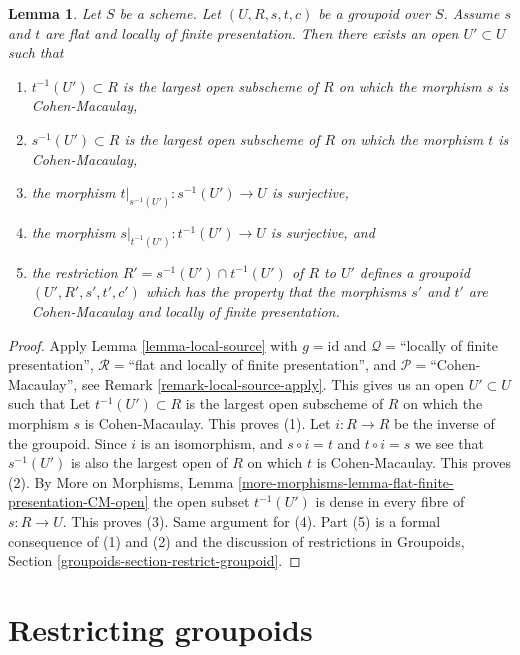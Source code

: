 \documentclass{stacks-project}
\theoremstyle{plain}
\newtheorem{lemma}[subsection]{Lemma}
\theoremstyle{definition}
\theoremstyle{remark}
\numberwithin{equation}{subsection}
\begin{document}
\begin{lemma}
\label{lemma-make-CM}
Let $S$ be a scheme.
Let $(U, R, s, t, c)$ be a groupoid over $S$.
Assume $s$ and $t$ are flat and locally of finite presentation.
Then there exists an open $U' \subset U$ such that
\begin{enumerate}
\item $t^{-1}(U') \subset R$ is the largest open subscheme of
$R$ on which the morphism $s$ is Cohen-Macaulay,
\item $s^{-1}(U') \subset R$ is the largest open subscheme of
$R$ on which the morphism $t$ is Cohen-Macaulay,
\item the morphism $t|_{s^{-1}(U')} : s^{-1}(U') \to U$ is
surjective,
\item the morphism $s|_{t^{-1}(U')} : t^{-1}(U') \to U$ is
surjective, and
\item the restriction $R' = s^{-1}(U') \cap t^{-1}(U')$
of $R$ to $U'$ defines a groupoid $(U', R', s', t', c')$ which has the property
that the morphisms $s'$ and $t'$ are Cohen-Macaulay and locally of
finite presentation.
\end{enumerate}
\end{lemma}

\begin{proof}
Apply
Lemma \ref{lemma-local-source}
with
$g = \text{id}$ and
$\mathcal{Q} =$``locally of finite presentation'',
$\mathcal{R} =$``flat and locally of finite presentation'', and
$\mathcal{P}=$``Cohen-Macaulay'', see
Remark \ref{remark-local-source-apply}.
This gives us an open $U' \subset U$ such that
Let $t^{-1}(U') \subset R$ is the largest open subscheme of $R$
on which the morphism $s$ is Cohen-Macaulay.
This proves (1).
Let $i : R \to R$ be the inverse of the groupoid.
Since $i$ is an isomorphism, and $s \circ i = t$ and $t \circ i = s$
we see that $s^{-1}(U')$ is also the largest open of $R$ on which $t$ is
Cohen-Macaulay. This proves (2).
By
More on Morphisms,
Lemma \ref{more-morphisms-lemma-flat-finite-presentation-CM-open}
the open subset $t^{-1}(U')$ is dense in every fibre of $s : R \to U$.
This proves (3). Same argument for (4).
Part (5) is a formal consequence of (1) and (2) and the discussion
of restrictions in
Groupoids, Section \ref{groupoids-section-restrict-groupoid}.
\end{proof}








\section{Restricting groupoids}
\label{section-restricting-groupoids}
\end{document}
